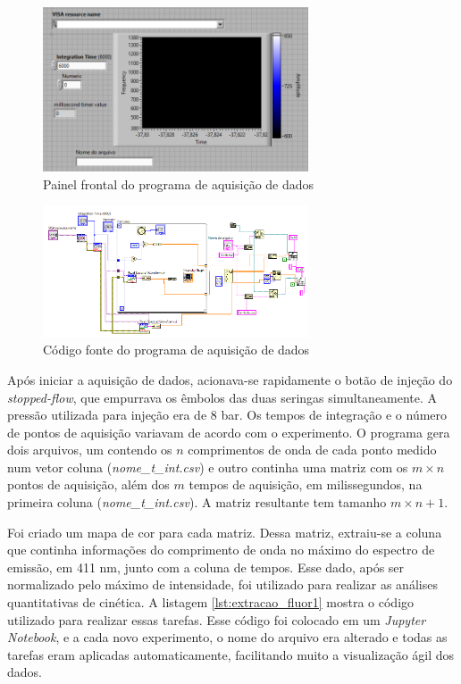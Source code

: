 			\begin{figure}[h]
				\centering
				\includegraphics[width=0.7\textwidth]{imagens/fluor/painel_frontal}
				\caption{Painel frontal do programa de aquisição de dados}
				\label{fig:fluor_painelfrontal}
			\end{figure}
			
			\begin{figure}[h]
				\centering
				\includegraphics[width=0.7\textwidth]{imagens/fluor/gravacao_dados}
				\caption{Código fonte do programa de aquisição de dados}
				\label{fig:fluor_gravacaodados}
			\end{figure}

			Após iniciar a aquisição de dados, acionava-se rapidamente o botão de injeção do \emph{stopped-flow}, que empurrava os êmbolos das duas seringas simultaneamente. A pressão utilizada para injeção era de 8 bar. Os tempos de integração e o número de pontos de aquisição variavam de acordo com o experimento. O programa gera dois arquivos, um contendo os \(n\) comprimentos de onda de cada ponto medido num vetor coluna (\emph{nome\_t\_int.csv}) e outro continha uma matriz com os \(m \times n\) pontos de aquisição, além dos \(m\) tempos de aquisição, em milissegundos, na primeira coluna (\emph{nome\_t\_int.csv}). A matriz resultante tem tamanho \(m\times n+1\).
			
			Foi criado um mapa de cor para cada matriz. Dessa matriz, extraiu-se a coluna que continha informações do comprimento de onda no máximo do espectro de emissão, em 411 nm, junto com a coluna de tempos. Esse dado, após ser normalizado pelo máximo de intensidade, foi utilizado para realizar as análises quantitativas de cinética. A listagem \ref{lst:extracao_fluor1} mostra o código utilizado para realizar essas tarefas. Esse código foi colocado em um \emph{Jupyter Notebook}, e a cada novo experimento, o nome do arquivo era alterado e todas as tarefas eram aplicadas automaticamente, facilitando muito a visualização ágil dos dados.
			
